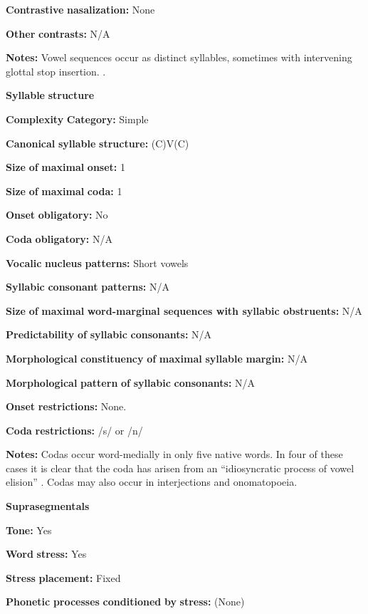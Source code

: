 \textbf{Contrastive} \textbf{nasalization:} None

\textbf{Other} \textbf{contrasts:} N/A

\textbf{Notes:} Vowel sequences occur as distinct syllables, sometimes with intervening glottal stop insertion. \citep[28-9]{Guillaume2008}.

\textbf{Syllable} \textbf{structure}

\textbf{Complexity} \textbf{Category:} Simple

\textbf{Canonical} \textbf{syllable} \textbf{structure:} (C)V(C) \citep[30-32]{Guillaume2008}

\textbf{Size} \textbf{of} \textbf{maximal} \textbf{onset:} 1

\textbf{Size} \textbf{of} \textbf{maximal} \textbf{coda:} 1

\textbf{Onset} \textbf{obligatory:} No

\textbf{Coda} \textbf{obligatory:} N/A

\textbf{Vocalic} \textbf{nucleus} \textbf{patterns:} Short vowels

\textbf{Syllabic} \textbf{consonant} \textbf{patterns:} N/A

\textbf{Size} \textbf{of} \textbf{maximal} \textbf{word{}-marginal sequences with syllabic obstruents:} N/A

\textbf{Predictability} \textbf{of} \textbf{syllabic} \textbf{consonants:} N/A

\textbf{Morphological} \textbf{constituency} \textbf{of} \textbf{maximal} \textbf{syllable} \textbf{margin:} N/A

\textbf{Morphological} \textbf{pattern} \textbf{of} \textbf{syllabic} \textbf{consonants:} N/A

\textbf{Onset} \textbf{restrictions:} None.

\textbf{Coda} \textbf{restrictions:} /s/ or /n/

\textbf{Notes:} Codas occur word-medially in only five native words. In four of these cases it is clear that the coda has arisen from an “idiosyncratic process of vowel elision” \citep[31]{Guillaume2008}. Codas may also occur in interjections and onomatopoeia.

\textbf{Suprasegmentals}

\textbf{Tone:} Yes

\textbf{Word} \textbf{stress:} Yes

\textbf{Stress} \textbf{placement:} Fixed

\textbf{Phonetic} \textbf{processes} \textbf{conditioned} \textbf{by} \textbf{stress:} (None)

